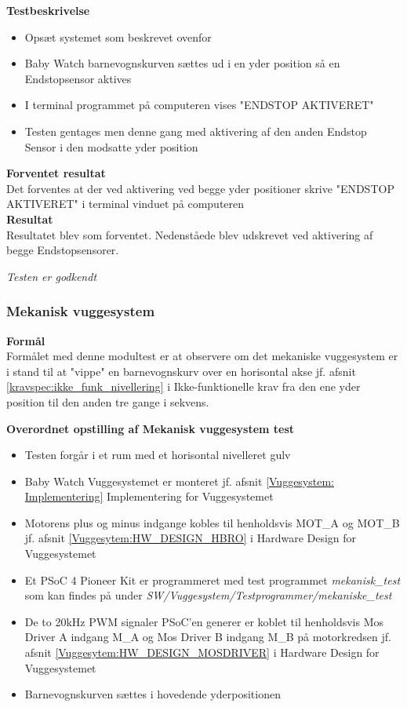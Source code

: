 \textbf{Testbeskrivelse}
\begin{itemize}
	\item Opsæt systemet som beskrevet ovenfor
	\item Baby Watch barnevognskurven sættes ud i en yder position så en Endstopsensor aktives
	\item I terminal programmet på computeren vises "ENDSTOP AKTIVERET"
	\item Testen gentages men denne gang med aktivering af den anden Endstop Sensor i den modsatte yder position
\end{itemize}

\textbf{Forventet resultat} \\
Det forventes at der ved aktivering ved begge yder positioner skrive "ENDSTOP AKTIVERET" i terminal vinduet på computeren \\
\textbf{Resultat} \\
Resultatet blev som forventet. Nedenståede blev udskrevet ved aktivering af begge Endstopsensorer.\\


\textit{Testen er godkendt}



\subsubsection{Mekanisk vuggesystem}
\textbf{Formål} \\
Formålet med denne modultest er at observere om det mekaniske vuggesystem er i stand til at "vippe" en barnevognskurv over en horisontal akse jf. afsnit \vref{kravspec:ikke_funk_nivellering} i Ikke-funktionelle krav fra den ene yder position til den anden tre gange i sekvens. 

\textbf{Overordnet opstilling af Mekanisk vuggesystem test}

\begin{itemize}
	\item Testen forgår i et rum med et horisontal nivelleret gulv
	\item Baby Watch Vuggesystemet er monteret jf. afsnit \ref{Vuggesystem: Implementering} Implementering for Vuggesystemet
	\item Motorens plus og minus indgange kobles til henholdsvis MOT\_A og MOT\_B jf. afsnit \ref{Vuggesytem:HW_DESIGN_HBRO} i Hardware Design for Vuggesystemet
	\item Et PSoC 4 Pioneer Kit \citep{Cypress} er programmeret med test programmet \textit{mekanisk\_test} som kan findes på \citep{cd} under \textit{SW/Vuggesystem/Testprogrammer/mekaniske\_test}
	\item De to 20kHz PWM signaler PSoC'en generer er koblet til henholdsvis Mos Driver A indgang M\_A og Mos Driver B indgang M\_B på motorkredsen jf. afsnit \vref{Vuggesytem:HW_DESIGN_MOSDRIVER} i Hardware Design for Vuggesystemet
	\item Barnevognskurven sættes i hovedende yderpositionen
\end{itemize}


